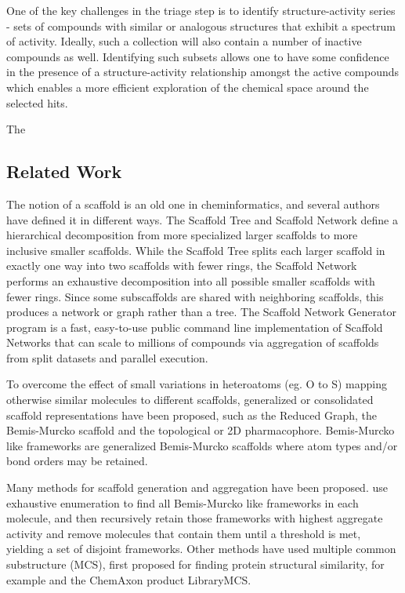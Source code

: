 \documentclass[journal=jacsat,manuscript=article]{achemso}
\begin{document}
One of the key challenges in the triage step is to identify structure-activity series - sets of compounds with similar or analogous structures that exhibit a spectrum of activity. Ideally, such a collection will also contain a number of inactive compounds as well. Identifying such subsets allows one to have some confidence in the presence of a structure-activity relationship amongst the active compounds which enables a more efficient exploration of the chemical space around the selected hits.

The 

\subsection{Related Work}
The notion of a scaffold is an old one in cheminformatics, and several authors \cite{ScaffoldRefs} have defined it in different ways. The Scaffold Tree\cite{Ertl2011ScaffoldTree} and Scaffold Network\cite{Varin2011ScafNet} define a hierarchical decomposition from more specialized larger scaffolds to more inclusive smaller scaffolds. While the Scaffold Tree splits each larger scaffold in exactly one way into two scaffolds with fewer rings, the Scaffold Network performs an exhaustive decomposition into all possible smaller scaffolds with fewer rings.  Since some subscaffolds are shared with neighboring scaffolds, this produces a network or graph rather than a tree. The Scaffold Network Generator program\cite{Matlock2013SNG} is a fast, easy-to-use public command line implementation of Scaffold Networks that can scale to millions of compounds via aggregation of scaffolds from split datasets and parallel execution. 

To overcome the effect of small variations in heteroatoms (eg. O to S) mapping 
otherwise similar molecules to different scaffolds, generalized or consolidated scaffold representations have been proposed, such as the Reduced Graph\cite{Barker2003RG}, the Bemis-Murcko scaffold\cite{BemisMurcko1996} and the topological or 2D pharmacophore\cite{Schneider1999ScafHopTP}. Bemis-Murcko like frameworks \cite{Harper2004DDclus} are generalized Bemis-Murcko scaffolds where atom types and/or bond orders may be retained.    

Many methods for scaffold generation and aggregation have been proposed.  \citeauthor{Harper2004DDclus} use exhaustive enumeration to find all Bemis-Murcko like frameworks in each molecule, and then recursively retain those frameworks with highest aggregate activity and remove molecules that contain them until a threshold is met, yielding a set of disjoint frameworks.   Other methods have used multiple common substructure (MCS), first proposed for finding protein structural similarity\cite{Koch1997MCSprot}, for example \citeauthor{Quintus2009MCS} and the ChemAxon product LibraryMCS. 
\end{document}
